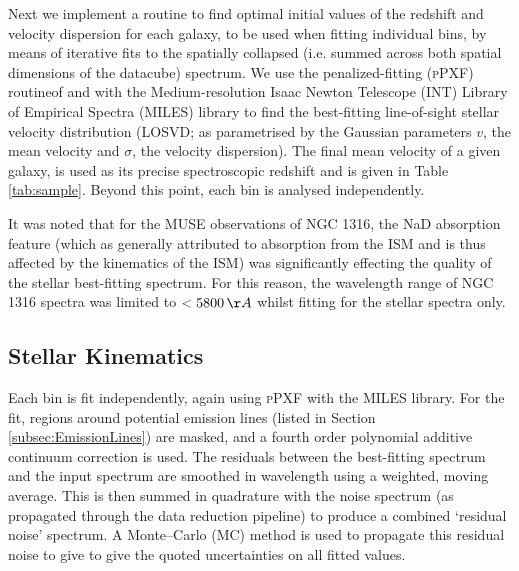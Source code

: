 \documentclass[a4paper,fleqn,usenatbib]{mnras}
\begin{document}
	Next we implement a routine to find optimal initial values of the redshift and velocity dispersion for each galaxy, to be used when fitting individual bins, by means of iterative fits to the spatially collapsed (i.e. summed across both spatial dimensions of the datacube) spectrum. We use the penalized-fitting (\textsc{pPXF}) routine\footnotemark[1] of \citet{Cappellari2004} and \citet{Cappellari2016a} with the Medium-resolution Isaac Newton Telescope (INT) Library of Empirical Spectra (MILES) library \citep{Sanchez-Blazquez2006, Falcon-Barroso2011a} to find the best-fitting line-of-sight stellar velocity distribution (LOSVD; as parametrised by the Gaussian parameters $v$, the mean velocity and $\sigma$, the velocity dispersion). The final mean velocity of a given galaxy, is used as its precise spectroscopic redshift and is given in Table \ref{tab:sample}. Beyond this point, each bin is analysed independently.

	It was noted that for the MUSE observations of NGC 1316, the NaD absorption feature (which as generally attributed to absorption from the ISM and is thus affected by the kinematics of the ISM) was significantly effecting the quality of the stellar best-fitting spectrum. For this reason, the wavelength range of NGC 1316 spectra was limited to $<5800 \, \AA$ whilst fitting for the stellar spectra only.

	\subsection{Stellar Kinematics}
		\label{subsec:starKin}
		Each bin is fit independently, again using \textsc{pPXF} with the MILES library. For the fit, regions around potential emission lines (listed in Section \ref{subsec:EmissionLines}) are masked, and a fourth order polynomial additive continuum correction is used. The residuals between the best-fitting spectrum and the input spectrum are smoothed in wavelength using a weighted, moving average. This is then summed in quadrature with the noise spectrum (as propagated through the data reduction pipeline) to produce a combined `residual noise' spectrum. A Monte--Carlo (MC) method is used to propagate this residual noise to give to give the quoted uncertainties on all fitted values. 
\end{document}
